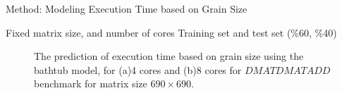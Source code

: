 \documentclass[10pt]{beamer}
\begin{document}
\begin{frame}{Method: Modeling Execution Time based on Grain Size}
\begin{outline}	
	\1Fixed matrix size, and number of cores	
	\1Training set and test set (\%60, \%40)	

	\begin{figure}[H]
		\caption{The prediction of execution time based on grain size using the bathtub model, for (a)4 cores and (b)8 cores for $DMATDMATADD$ benchmark for matrix size $690\times690$.}	
		\label{fig22}
	\end{figure}
\end{outline}
\end{frame}
\end{document}
